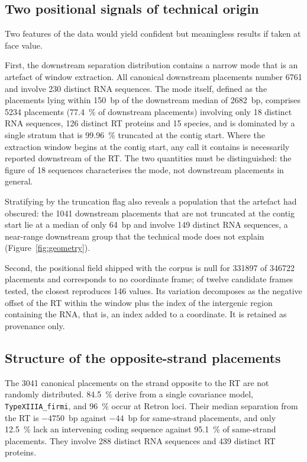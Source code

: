 \subsection{Two positional signals of technical origin}
\label{sec:dbchar:technical}

Two features of the data would yield confident but meaningless results if taken at face value.

First, the downstream separation distribution contains a narrow mode that is an artefact of window
extraction. All canonical downstream placements number \num{6761} and involve 230 distinct RNA
sequences. The mode itself, defined as the placements lying within 150~bp of the downstream median
of \num{2682}~bp, comprises \num{5234} placements (\SI{77.4}{\percent} of downstream placements)
involving only 18 distinct RNA sequences, 126 distinct RT proteins and 15 species, and is dominated
by a single stratum that is \SI{99.96}{\percent} truncated at the contig start. Where the extraction
window begins at the contig start, any call it contains is necessarily reported downstream of the
RT. The two quantities must be distinguished: the figure of 18 sequences characterises the mode, not
downstream placements in general.

Stratifying by the truncation flag also reveals a population that the artefact had obscured: the
\num{1041} downstream placements that are not truncated at the contig start lie at a median of only
64~bp and involve 149 distinct RNA sequences, a near-range downstream group that the technical mode
does not explain (Figure~\ref{fig:geometry}).

Second, the positional field shipped with the corpus is null for \num{331897} of \num{346722}
placements and corresponds to no coordinate frame; of twelve candidate frames tested, the closest
reproduces 146 values. Its variation decomposes as the negative offset of the RT within the window
plus the index of the intergenic region containing the RNA, that is, an index added to a coordinate.
It is retained as provenance only.

\subsection{Structure of the opposite-strand placements}
\label{sec:dbchar:opposite}

The \num{3041} canonical placements on the strand opposite to the RT are not randomly distributed.
\SI{84.5}{\percent} derive from a single covariance model, \texttt{TypeXIIIA\_firmi}, and
\SI{96}{\percent} occur at Retron loci. Their median separation from the RT is $-4750$~bp against
$-44$~bp for same-strand placements, and only \SI{12.5}{\percent} lack an intervening coding
sequence against \SI{95.1}{\percent} of same-strand placements. They involve 288 distinct RNA
sequences and 439 distinct RT proteins.

